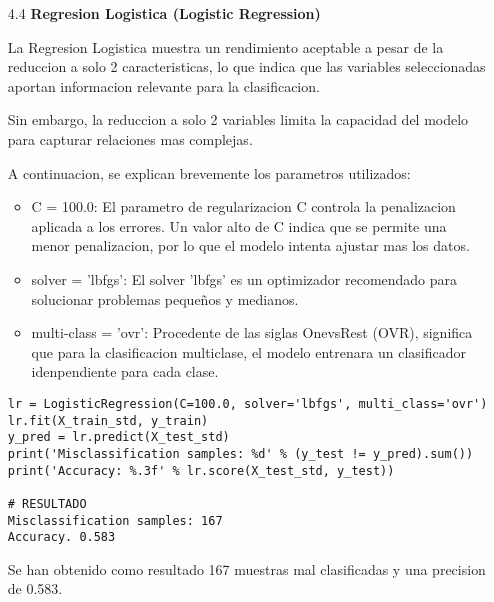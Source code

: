 \documentclass{article}
\begin{document}
\begin{itemize}

\item[4.4]  {\bf Regresion Logistica (Logistic Regression)}

La Regresion Logistica muestra un rendimiento aceptable a pesar de la reduccion a solo 2 caracteristicas, lo que indica que las variables seleccionadas aportan informacion relevante para la clasificacion.

Sin embargo, la reduccion a solo 2 variables limita la capacidad del modelo para capturar relaciones mas complejas.

A continuacion, se explican brevemente los parametros utilizados:

\begin{itemize}

\item
C = 100.0: El parametro de regularizacion C controla la penalizacion aplicada a los errores. Un valor alto de C indica que se permite una menor penalizacion, por lo que el modelo intenta ajustar mas los datos.

\item
solver = 'lbfgs': El solver 'lbfgs' es un optimizador recomendado para solucionar problemas pequeños y medianos.

\item
multi-class = 'ovr': Procedente de las siglas OnevsRest (OVR), significa que para la
clasificacion multiclase, el modelo entrenara un clasificador idenpendiente para cada 
clase.

\end{itemize}

\begin{tcolorbox}[width=14cm]
\begin{scriptsize}
\begin{verbatim}
lr = LogisticRegression(C=100.0, solver='lbfgs', multi_class='ovr')
lr.fit(X_train_std, y_train)
y_pred = lr.predict(X_test_std)
print('Misclassification samples: %d' % (y_test != y_pred).sum())
print('Accuracy: %.3f' % lr.score(X_test_std, y_test))

# RESULTADO
Misclassification samples: 167
Accuracy. 0.583
\end{verbatim}
\end{scriptsize}
\end{tcolorbox}

Se han obtenido como resultado 167 muestras mal clasificadas y una precision de 0.583.

\end{itemize}
\end{document}
